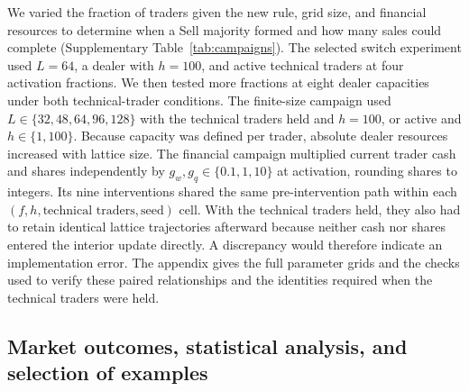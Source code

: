 We varied the fraction of traders given the new rule, grid size, and
financial resources to determine when a Sell majority formed and how
many sales could complete (Supplementary Table~\ref{tab:campaigns}).
The selected switch
experiment used $L=64$, a dealer with $h=100$, and active technical traders at
four activation fractions. We then tested more fractions at eight dealer capacities under both
technical-trader conditions. The finite-size campaign
used $L\in\{32,48,64,96,128\}$ with the technical traders held and $h=100$,
or active and $h\in\{1,100\}$. Because capacity was defined
per trader, absolute dealer resources increased with lattice size.
The financial campaign multiplied current trader cash and shares independently
by $g_w,g_q\in\{0.1,1,10\}$ at activation, rounding shares to integers.
Its nine interventions shared the same pre-intervention path within each
$(f,h,\text{technical traders},\text{seed})$ cell. With the technical traders held, they also
had to retain identical lattice trajectories afterward because neither cash nor shares entered the
interior update directly.
A discrepancy would therefore indicate an implementation error.
The appendix gives the full parameter grids and the checks used to verify
these paired relationships and the identities required when the technical
traders were held.

\subsection{Market outcomes, statistical analysis, and selection of examples}

